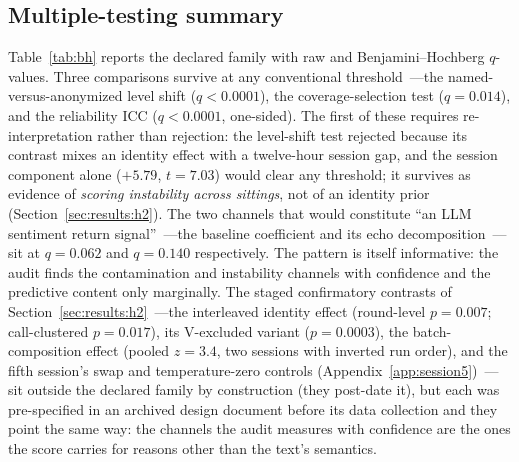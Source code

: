 \subsection{Multiple-testing summary}

Table~\ref{tab:bh} reports the declared family with raw and Benjamini--Hochberg $q$-values. Three comparisons survive at any conventional threshold~---the named-versus-anonymized level shift ($q<0.0001$), the coverage-selection test ($q=0.014$), and the reliability ICC ($q<0.0001$, one-sided). The first of these requires re-interpretation rather than rejection: the level-shift test rejected because its contrast mixes an identity effect with a twelve-hour session gap, and the session component alone ($+5.79$, $t=7.03$) would clear any threshold; it survives as evidence of \emph{scoring instability across sittings}, not of an identity prior (Section~\ref{sec:results:h2}). The two channels that would constitute ``an LLM sentiment return signal''~---the baseline coefficient and its echo decomposition~---sit at $q=0.062$ and $q=0.140$ respectively. The pattern is itself informative: the audit finds the contamination and instability channels with confidence and the predictive content only marginally. The staged confirmatory contrasts of Section~\ref{sec:results:h2}~---the interleaved identity effect (round-level $p=0.007$; call-clustered $p=0.017$), its V-excluded variant ($p=0.0003$), the batch-composition effect (pooled $z=3.4$, two sessions with inverted run order), and the fifth session's swap and temperature-zero controls (Appendix~\ref{app:session5})~---sit outside the declared family by construction (they post-date it), but each was pre-specified in an archived design document before its data collection and they point the same way: the channels the audit measures with confidence are the ones the score carries for reasons other than the text's semantics.

